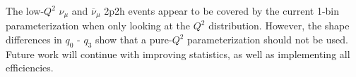 \documentclass[12pt]{article}
\begin{document}
The low-$Q^2$ $\nu_{\mu}$ and $\overline{\nu}_{\mu}$ 2p2h events appear to be covered by the current 1-bin parameterization when only looking at the $Q^2$ distribution. However, the shape differences in $q_0 \textrm{ - } q_3$ show that a pure-$Q^2$ parameterization should not be used. Future work will continue with improving statistics, as well as implementing all efficiencies.

\end{document}
